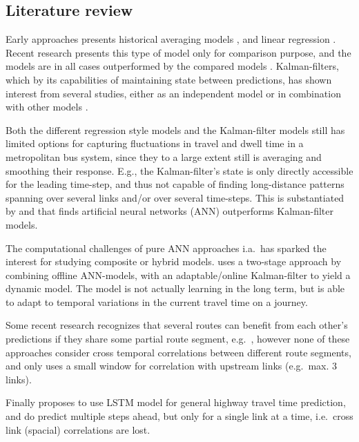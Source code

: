 \documentclass[preprint,11pt,5p,twocolumn]{elsarticle}
\begin{document}
\subsection{Literature review}
Early approaches presents historical averaging models \cite{Dailey1999,Sun2007}, and linear regression \cite{Patnaik2004}. Recent research presents this type of model only for comparison purpose, and the models are in all cases outperformed by the compared models \cite{Shalaby2004,Jeong2005}. Kalman-filters, which by its capabilities of maintaining state between predictions, has shown interest from several studies, either as an independent model \cite{Chen2001,Shalaby2004} or in combination with other models \cite{Zaki2013,Bai2015}. 

Both the different regression style models and the Kalman-filter models still has limited options for capturing fluctuations in travel and dwell time in a metropolitan bus system, since they to a large extent still is averaging and smoothing their response. E.g., the Kalman-filter's state is only directly accessible for the leading time-step, and thus not capable of finding long-distance patterns spanning over several links and/or over several time-steps. This is substantiated by \cite{Lin2013} and \cite{Kumar2014} that finds artificial neural networks (ANN) outperforms Kalman-filter models.

The computational challenges of pure ANN approaches i.a.\ has sparked the interest for studying composite or hybrid models. \citet{Zaki2013} uses a two-stage approach by combining offline ANN-models, with an adaptable/online Kalman-filter to yield a dynamic model. The model is not actually learning in the long term, but is able to adapt to temporal variations in the current travel time on a journey.

Some recent research recognizes that several routes can benefit from each other's predictions if they share some partial route segment, e.g.\ \cite{Yu2011,Gal2014,Bai2015}, however none of these approaches consider cross temporal correlations between different route segments, and only uses a small window for correlation with upstream links (e.g.\ max. 3 links).

Finally \citet{YanjieDuan2016} proposes to use LSTM model for general highway travel time prediction, and do predict multiple steps ahead, but only for a single link at a time, i.e.\ cross link (spacial) correlations are lost.
\end{document}
